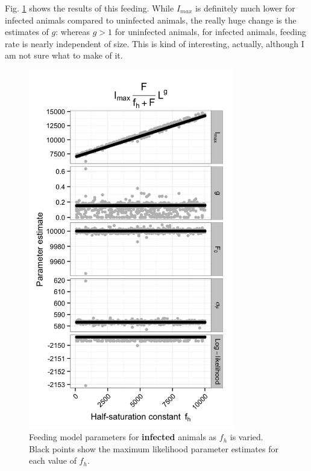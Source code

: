\documentclass[12pt,reqno,final,pdftex]{amsart}\usepackage[]{graphicx}\usepackage[]{color}
\newenvironment{knitrout}{}{} %
\theoremstyle{plain}
\numberwithin{equation}{part}
\begin{document}
Fig. \ref{fig:inf-feeding} shows the results of this feeding.
While $I_{max}$ is definitely much lower for infected animals compared to uninfected animals, the really huge change is the estimates of $g$: whereas $g > 1$ for uninfected animals, for infected animals, feeding rate is nearly independent of size.
This is kind of interesting, actually, although I am not sure what to make of it.
\begin{knitrout}\scriptsize
{}\color{fgcolor}\begin{figure}

\includegraphics[width=0.8\textwidth]{figure/inf-feeding-1} \hfill{}

\caption[Feeding model parameters for \textbf{infected} animals as ]{Feeding model parameters for \textbf{infected} animals as $f_h$ is varied. Black points show the maximum likelihood parameter estimates for each value of $f_h$.}\label{fig:inf-feeding}
\end{figure}


\end{knitrout}
\end{document}
